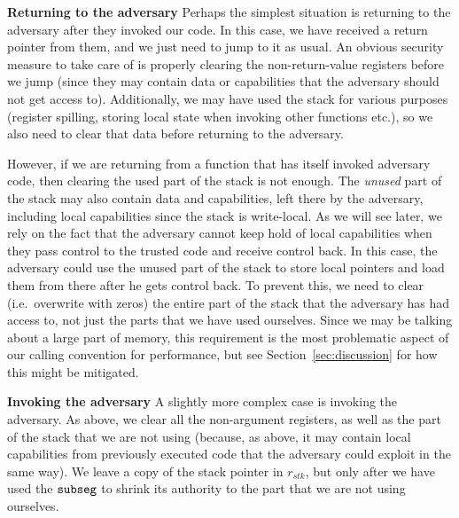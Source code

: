\documentclass[compsoc,conference,letterpaper,fleqn]{IEEEtran}
\newcommand{\var}[1]{\mathit{#1}}
\newcommand{\stk}{\var{stk}}
\newcommand{\zinstr}[1]{\mathtt{#1}}
\newcommand{\threeinstr}[4]{
  \ifthenelse{\equal{#2#3#4}{}}
  {\zinstr{#1}}
  {\zinstr{#1} \; #2 \; #3 \; #4}
}
\newcommand{\subseg}[3]{\threeinstr{subseg}{#1}{#2}{#3}}
\begin{document}
\textbf{Returning to the adversary} Perhaps the simplest situation is returning
to the adversary after they invoked our code. In this case, we have received a
return pointer from them, and we just need to jump to it as usual. An obvious
security measure to take care of is properly clearing the non-return-value
registers before we jump (since they may contain data or capabilities that the
adversary should not get access to). Additionally, we may have used the stack
for various purposes (register spilling, storing local state when invoking other
functions etc.), so we also need to clear that data before returning to the
adversary.

However, if we are returning from a function that has itself invoked adversary
code, then clearing the used part of the stack is not enough. The \emph{unused}
part of the stack may also contain data and capabilities, left there by the
adversary, including local capabilities since the stack is write-local. As we
will see later, we rely on the fact that the adversary cannot keep hold of local
capabilities when they pass control to the trusted code and receive control
back. In this case, the adversary could use the unused part of the stack to
store local pointers and load them from there after he gets control back. To
prevent this, we need to clear (i.e.\ overwrite with zeros) the entire part of
the stack that the adversary has had access to, not just the parts that we have
used ourselves. Since we may be talking about a large part of memory, this
requirement is the most problematic aspect of our calling convention for
performance, but see Section~\ref{sec:discussion} for how this might be
mitigated.

\textbf{Invoking the adversary} A slightly more complex case is invoking the
adversary. As above, we clear all the non-argument registers, as well as the
part of the stack that we are not using (because, as above, it may contain local
capabilities from previously executed code that the adversary could exploit in
the same way). We leave a copy of the stack pointer in $r_\stk$, but only after
we have used the $\subseg{}{}{}$ to shrink its authority to the part that we are
not using ourselves.
\end{document}
